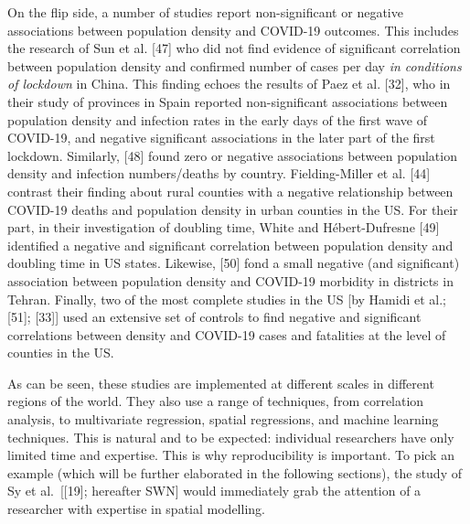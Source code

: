 \documentclass[10pt,letterpaper]{article}
\begin{document}
On the flip side, a number of studies report non-significant or negative
associations between population density and COVID-19 outcomes. This
includes the research of Sun et al. {[}47{]} who did not find evidence
of significant correlation between population density and confirmed
number of cases per day \emph{in conditions of lockdown} in China. This
finding echoes the results of Paez et al. {[}32{]}, who in their study
of provinces in Spain reported non-significant associations between
population density and infection rates in the early days of the first
wave of COVID-19, and negative significant associations in the later
part of the first lockdown. Similarly, {[}48{]} found zero or negative
associations between population density and infection numbers/deaths by
country. Fielding-Miller et al. {[}44{]} contrast their finding about
rural counties with a negative relationship between COVID-19 deaths and
population density in urban counties in the US. For their part, in their
investigation of doubling time, White and Hébert-Dufresne {[}49{]}
identified a negative and significant correlation between population
density and doubling time in US states. Likewise, {[}50{]} fond a small
negative (and significant) association between population density and
COVID-19 morbidity in districts in Tehran. Finally, two of the most
complete studies in the US {[}by Hamidi et al.; {[}51{]}; {[}33{]}{]}
used an extensive set of controls to find negative and significant
correlations between density and COVID-19 cases and fatalities at the
level of counties in the US.

As can be seen, these studies are implemented at different scales in
different regions of the world. They also use a range of techniques,
from correlation analysis, to multivariate regression, spatial
regressions, and machine learning techniques. This is natural and to be
expected: individual researchers have only limited time and expertise.
This is why reproducibility is important. To pick an example (which will
be further elaborated in the following sections), the study of Sy et
al.~{[}{[}19{]}; hereafter SWN{]} would immediately grab the attention
of a researcher with expertise in spatial modelling.
\end{document}
